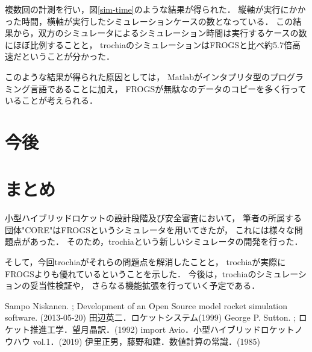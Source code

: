 \documentclass[a4j,10pt]{jsarticle}
\begin{document}
複数回の計測を行い，図\ref{sim-time}のような結果が得られた．
縦軸が実行にかかった時間，横軸が実行したシミュレーションケースの数となっている．
この結果から，双方のシミュレータによるシミュレーション時間は実行するケースの数にほぼ比例することと，
trochiaのシミュレーションはFROGSと比べ約5.7倍高速だということが分かった．

このような結果が得られた原因としては，
Matlabがインタプリタ型のプログラミング言語であることに加え，
FROGSが無駄なのデータのコピーを多く行っていることが考えられる．

\section{今後}

\section{まとめ}

小型ハイブリッドロケットの設計段階及び安全審査において，
筆者の所属する団体"CORE"はFROGSというシミュレータを用いてきたが，
これには様々な問題点があった．
そのため，trochiaという新しいシミュレータの開発を行った．

そして，今回trochiaがそれらの問題点を解消したことと，
trochiaが実際にFROGSよりも優れているということを示した．
今後は，trochiaのシミュレーションの妥当性検証や，
さらなる機能拡張を行っていく予定である．

% 
% 

\begin{thebibliography}{99}
		Sampo Niskanen. ; Development of an Open Source model rocket simulation software. (2013-05-20)
		田辺英二．ロケットシステム(1999)
		George P. Sutton. ; ロケット推進工学．望月晶訳．(1992)
		import Avio．小型ハイブリッドロケットノウハウ vol.1．(2019)
		伊里正男，藤野和建．数値計算の常識．(1985)
\end{thebibliography}
\end{document}
